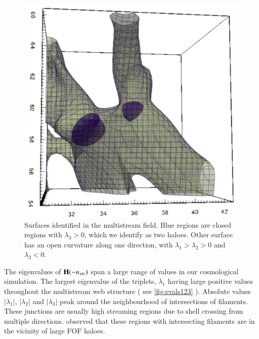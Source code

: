 \begin{figure}
\begin{minipage}[t]{.99\linewidth}
  \centering\includegraphics[width=6.cm]{Chapter4/Source_v2/fig9.pdf} 
\end{minipage}\hfill
\caption{Surfaces identified in the multistream field. Blue regions are closed regions with $\lambda_3 > 0 $, which we identify as two haloes. Other surface has an open curvature along one direction, with $\lambda_1 > \lambda_2 > 0$ and $ \lambda_3 < 0$. }
\label{fig:SmallBox}
\end{figure}

The eigenvalues of ${\bf H}(-n_{str})$ span a large range of values in our cosmological simulation. The largest eigenvalue of the triplets, $\lambda_1$ having large positive values throughout the multistream web structure ( see \autoref{fig:evals123} ). Absolute values $|\lambda_1|$, $|\lambda_2|$ and $|\lambda_3|$ peak around the neighbourhood of intersections of filaments. These junctions are usually high streaming regions due to shell crossing from multiple directions. \cite{Ramachandra2015} observed that these regions with intersecting filaments are in the vicinity of large FOF haloes. 

